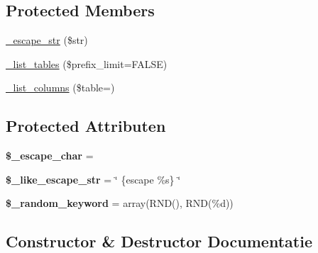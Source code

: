 \subsection*{Protected Members}
\begin{DoxyCompactItemize}
\item 
\mbox{\hyperlink{class_c_i___d_b__pdo__odbc__driver_af8ef0237bfcdb19215b63fff769e7a55}{\+\_\+escape\+\_\+str}} (\$str)
\item 
\mbox{\hyperlink{class_c_i___d_b__pdo__odbc__driver_a435c0f3ce54fe7daa178baa8532ebd54}{\+\_\+list\+\_\+tables}} (\$prefix\+\_\+limit=F\+A\+L\+SE)
\item 
\mbox{\hyperlink{class_c_i___d_b__pdo__odbc__driver_a7ccb7f9c301fe7f0a9db701254142b63}{\+\_\+list\+\_\+columns}} (\$table=\textquotesingle{}\textquotesingle{})
\end{DoxyCompactItemize}
\subsection*{Protected Attributen}
\begin{DoxyCompactItemize}
\item 
\mbox{\label{class_c_i___d_b__pdo__odbc__driver_aaec2fb0112850159063a8e47ad3aed6e}} 
{\bfseries \$\+\_\+escape\+\_\+char} = \textquotesingle{}\textquotesingle{}
\item 
\mbox{\label{class_c_i___d_b__pdo__odbc__driver_adf86ecadf3d0e1ce3f5e0eaeeb3867ae}} 
{\bfseries \$\+\_\+like\+\_\+escape\+\_\+str} = \char`\"{} \{escape \textquotesingle{}\%s\textquotesingle{}\} \char`\"{}
\item 
\mbox{\label{class_c_i___d_b__pdo__odbc__driver_a10213aa6e05f6d924d3277bb1d2fea00}} 
{\bfseries \$\+\_\+random\+\_\+keyword} = array(\textquotesingle{}R\+ND()\textquotesingle{}, \textquotesingle{}R\+ND(\%d)\textquotesingle{})
\end{DoxyCompactItemize}


\subsection{Constructor \& Destructor Documentatie}
\mbox{\label{class_c_i___d_b__pdo__odbc__driver_a9162320adff1a1a4afd7f2372f753a3e}} 
